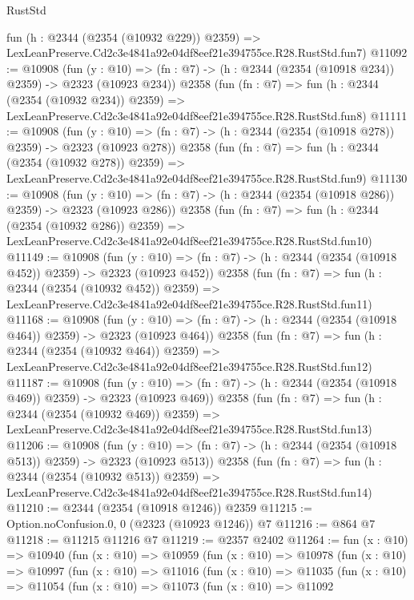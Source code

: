 \begin{lexlean}{RustStd}
\begin{coremodule}
    fun (h : @2344 (@2354 (@10932 @229)) @2359) =>
    LexLeanPreserve.Cd2c3e4841a92e04df8eef21e394755ce.R28.RustStd.fun7)
@11092 := @10908
    (fun (y : @10) => (fn : @7) -> (h : @2344 (@2354 (@10918 @234)) @2359) -> @2323 (@10923 @234))
    @2358
    (fun (fn : @7) =>
    fun (h : @2344 (@2354 (@10932 @234)) @2359) =>
    LexLeanPreserve.Cd2c3e4841a92e04df8eef21e394755ce.R28.RustStd.fun8)
@11111 := @10908
    (fun (y : @10) => (fn : @7) -> (h : @2344 (@2354 (@10918 @278)) @2359) -> @2323 (@10923 @278))
    @2358
    (fun (fn : @7) =>
    fun (h : @2344 (@2354 (@10932 @278)) @2359) =>
    LexLeanPreserve.Cd2c3e4841a92e04df8eef21e394755ce.R28.RustStd.fun9)
@11130 := @10908
    (fun (y : @10) => (fn : @7) -> (h : @2344 (@2354 (@10918 @286)) @2359) -> @2323 (@10923 @286))
    @2358
    (fun (fn : @7) =>
    fun (h : @2344 (@2354 (@10932 @286)) @2359) =>
    LexLeanPreserve.Cd2c3e4841a92e04df8eef21e394755ce.R28.RustStd.fun10)
@11149 := @10908
    (fun (y : @10) => (fn : @7) -> (h : @2344 (@2354 (@10918 @452)) @2359) -> @2323 (@10923 @452))
    @2358
    (fun (fn : @7) =>
    fun (h : @2344 (@2354 (@10932 @452)) @2359) =>
    LexLeanPreserve.Cd2c3e4841a92e04df8eef21e394755ce.R28.RustStd.fun11)
@11168 := @10908
    (fun (y : @10) => (fn : @7) -> (h : @2344 (@2354 (@10918 @464)) @2359) -> @2323 (@10923 @464))
    @2358
    (fun (fn : @7) =>
    fun (h : @2344 (@2354 (@10932 @464)) @2359) =>
    LexLeanPreserve.Cd2c3e4841a92e04df8eef21e394755ce.R28.RustStd.fun12)
@11187 := @10908
    (fun (y : @10) => (fn : @7) -> (h : @2344 (@2354 (@10918 @469)) @2359) -> @2323 (@10923 @469))
    @2358
    (fun (fn : @7) =>
    fun (h : @2344 (@2354 (@10932 @469)) @2359) =>
    LexLeanPreserve.Cd2c3e4841a92e04df8eef21e394755ce.R28.RustStd.fun13)
@11206 := @10908
    (fun (y : @10) => (fn : @7) -> (h : @2344 (@2354 (@10918 @513)) @2359) -> @2323 (@10923 @513))
    @2358
    (fun (fn : @7) =>
    fun (h : @2344 (@2354 (@10932 @513)) @2359) =>
    LexLeanPreserve.Cd2c3e4841a92e04df8eef21e394755ce.R28.RustStd.fun14)
@11210 := @2344 (@2354 (@10918 @1246)) @2359
@11215 := Option.noConfusion.{0, 0} (@2323 (@10923 @1246)) @7
@11216 := @864 @7
@11218 := @11215 @11216 @7
@11219 := @2357 @2402
@11264 := fun (x : @10) =>
  @10940
    (fun (x : @10) =>
    @10959
      (fun (x : @10) =>
      @10978
        (fun (x : @10) =>
        @10997
          (fun (x : @10) =>
          @11016
            (fun (x : @10) =>
            @11035
              (fun (x : @10) =>
              @11054
                (fun (x : @10) =>
                @11073
                  (fun (x : @10) =>
                  @11092

\end{coremodule}
\end{lexlean}
